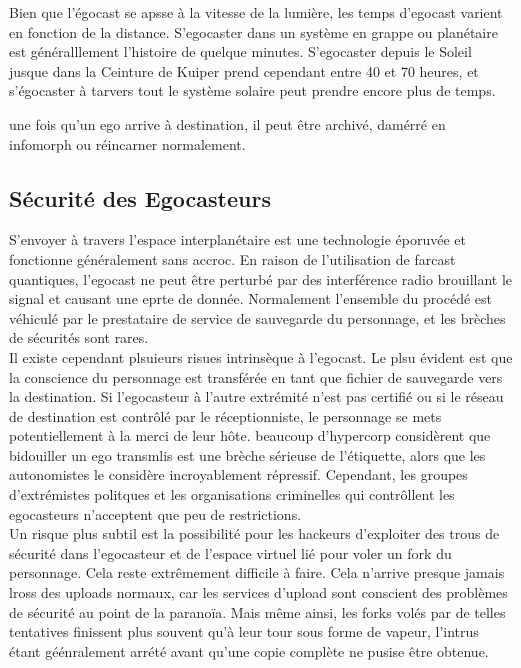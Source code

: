 Bien que l'égocast se apsse à la vitesse de la lumière, les temps d'egocast varient en fonction de la distance. S'egocaster dans un système en grappe ou planétaire est généralllement l'histoire de quelque minutes. S'egocaster depuis le Soleil jusque dans la Ceinture de Kuiper prend cependant entre 40 et 70 heures, et s'égocaster à tarvers tout le système solaire peut prendre encore plus de temps. 

une fois qu'un ego arrive à destination, il peut être archivé, damérré en infomorph ou réincarner normalement. 

\subsection{Sécurité des Egocasteurs} 

S'envoyer à travers l'espace interplanétaire est une technologie époruvée et fonctionne généralement sans accroc. En raison de l'utilisation de farcast quantiques, l'egocast ne peut être perturbé par des interférence radio brouillant le signal et causant une eprte de donnée. Normalement l'ensemble du procédé est véhiculé par le prestataire de service de sauvegarde du personnage, et les brèches de sécurités sont rares. \\ Il existe cependant plsuieurs risues intrinsèque à l'egocast. Le plsu évident est que la conscience du personnage est transférée en tant que fichier de sauvegarde vers la destination. Si l'egocasteur à l'autre extrémité n'est pas certifié ou si le réseau de destination est contrôlé par le réceptionniste, le personnage se mets potentiellement à la merci de leur hôte. beaucoup d'hypercorp considèrent que bidouiller un ego transmlis est une brèche sérieuse de l'étiquette, alors que les autonomistes le considère incroyablement répressif. Cependant, les groupes d'extrémistes politques et les organisations criminelles qui contrôllent les egocasteurs n'acceptent que peu de restrictions. \\ Un risque plus subtil est la possibilité pour les hackeurs d'exploiter des trous de sécurité dans l'egocasteur et de l'espace virtuel lié pour voler un fork du personnage. Cela reste extrêmement difficile à faire. Cela n'arrive presque jamais lross des uploads normaux, car les services d'upload sont conscient des problèmes de sécurité au point de la paranoïa. Mais même ainsi, les forks volés par de telles tentatives finissent plus souvent qu'à leur tour sous forme de vapeur, l'intrus étant géénralement arrété avant qu'une copie complète ne pusise être obtenue. 

